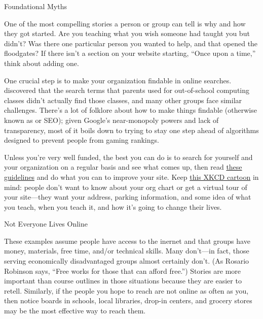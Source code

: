 \begin{aside}{Foundational Myths}

  One of the most compelling stories a person or group can tell is
  why and how they got started.
  Are you teaching what you wish someone had taught you but didn't?
  Was there one particular person you wanted to help,
  and that opened the floodgates?
  If there isn't a section on your website starting, ``Once upon a time,''
  think about adding one.

\end{aside}

One crucial step is to make your organization findable in online searches.
\cite{DiSa2014b} discovered that
the search terms that parents used for out-of-school computing classes
didn't actually find those classes,
and many other groups face similar challenges.
There's a lot of folklore about how to make things findable
(otherwise known as  or SEO);
given Google's near-monopoly powers and lack of transparency,
most of it boils down to trying to stay one step ahead of
algorithms designed to prevent people from gaming rankings.

Unless you're very well funded,
the best you can do is to search for yourself and your organization on a regular basis
and see what comes up,
then read \href{https://moz.com/learn/seo/on-page-factors}{these guidelines}
and do what you can to improve your site.
Keep \href{https://xkcd.com/773/}{this XKCD cartoon} in mind:
people don't want to know about your org chart or get a virtual tour of your site---they want your address,
parking information,
and some idea of what you teach,
when you teach it,
and how it's going to change their lives.

\begin{aside}{Not Everyone Lives Online}

  These examples assume people have access to the inernet
  and that groups have money, materials, free time, and/or technical skills.
  Many don't---in fact,
  those serving economically disadvantaged groups almost certainly don't.
  (As Rosario Robinson says, ``Free works for those that can afford free.'')
  Stories are more important than course outlines in those situations
  because they are easier to retell.
  Similarly,
  if the people you hope to reach are not online as often as you,
  then notice boards in schools,
  local libraries,
  drop-in centers,
  and grocery stores may be the most effective way to reach them.

\end{aside}

